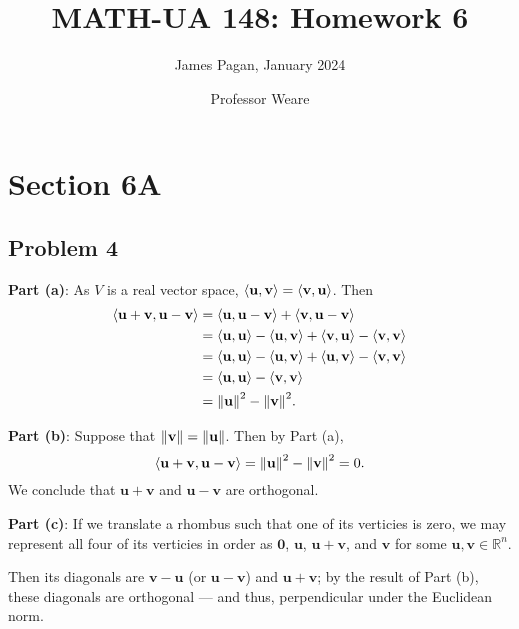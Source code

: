 \documentclass[11pt]{article}
\title{MATH-UA 148: Homework 6}
\author{James Pagan, January 2024}
\date{Professor Weare}
\renewcommand{\vec}[1]{\mathbf{#1}}
\begin{document}
\maketitle
\tableofcontents
\newpage


\section{Section 6A}


\subsection{Problem 4}

\textbf{Part (a)}: As $V$ is a real vector space, $\ev{\vec{u}, \vec{v}} = \ev{\vec{v}, \vec{u}}$. Then
\begin{align*}
	\ev{\vec{u} + \vec{v}, \vec{u} - \vec{v}} &= \ev{\vec{u}, \vec{u} - \vec{v}} + \ev{\vec{v}, \vec{u} - \vec{v}} \\
	&= \ev{\vec{u}, \vec{u}} - \ev{\vec{u}, \vec{v}} + \ev{\vec{v}, \vec{u}} - \ev{\vec{v}, \vec{v}} \\
	&= \ev{\vec{u}, \vec{u}} - \ev{\vec{u}, \vec{v}} + \ev{\vec{u}, \vec{v}} - \ev{\vec{v}, \vec{v}} \\
	&= \ev{\vec{u}, \vec{u}} - \ev{\vec{v}, \vec{v}} \\
	&= \norm{\vec{u}}^{2} - \norm{\vec{v}}^{2}.
\end{align*}

\textbf{Part (b)}: Suppose that $\norm{\vec{v}} = \norm{\vec{u}}$. Then by Part (a),
\[
	\ev{\vec{u} + \vec{v}, \vec{u} - \vec{v}} = \norm{\vec{u}}^{2} - \norm{\vec{v}}^{2} = 0.
\]
We conclude that $\vec{u} + \vec{v}$ and $\vec{u} - \vec{v}$ are orthogonal.

\textbf{Part (c)}: If we translate a rhombus such that one of its verticies is zero, we may represent all four of its verticies in order as $\vec{0}$, $\vec{u}$, $\vec{u} + \vec{v}$, and $\vec{v}$ for some $\vec{u}, \vec{v} \in \mathbb{R}^{n}$.

Then its diagonals are $\vec{v} - \vec{u}$ (or $\vec{u} - \vec{v}$) and $\vec{u} + \vec{v}$; by the result of Part (b), these diagonals are orthogonal --- and thus, perpendicular under the Euclidean norm.

\end{document}
